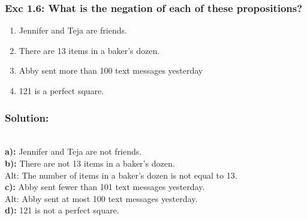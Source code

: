 \subsubsection*{Exc 1.6: What is the negation of each of these propositions?}
\begin{enumerate}[label=(\alph*)]
\item Jennifer and Teja are friends.
\item There are 13 items in a baker’s dozen.
\item Abby sent more than 100 text messages yesterday
\item 121 is a perfect square.
\end{enumerate}
\subsubsection*{Solution:}
\\
\textbf{a):} Jennifer and Teja are not friends.
\\
\textbf{b):} There are not 13 items in a baker’s dozen.
\\ Alt: The number of items in a baker’s dozen is not
equal to 13.
\\
\textbf{c):} Abby sent fewer than 101 text messages yesterday.
\\ Alt: Abby sent at most 100 text messages
yesterday.
\\
\textbf{d):} 121 is not a perfect square.
